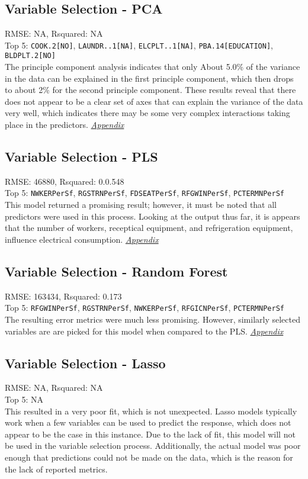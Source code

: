 \subsection{Variable Selection - PCA}
RMSE: NA, Rsquared: NA\\
Top 5: \lstinline{COOK.2[NO]}, \lstinline{LAUNDR..1[NA]}, \lstinline{ELCPLT..1[NA]}, \lstinline{PBA.14[EDUCATION]}, \lstinline{BLDPLT.2[NO]}
\\[0.1in]
\indent The principle component analysis indicates that only About 5.0\% of the variance in the data can be explained in the first principle component, which then drops to about 2\% for the second principle component.  These results reveal that there does not appear to be a clear set of axes that can explain the variance of the data very well, which indicates there may be some very complex interactions taking place in the predictors.  \textit{\hyperref[appendix:electricity:pca]{Appendix}}

\subsection{Variable Selection - PLS}
RMSE: 46880, Rsquared: 0.0.548\\
Top 5: \lstinline{NWKERPerSf}, \lstinline{RGSTRNPerSf}, \lstinline{FDSEATPerSf}, \lstinline{RFGWINPerSf}, \lstinline{PCTERMNPerSf}
\\[0.1in]
\indent This model returned a promising result; however, it must be noted that all predictors were used in this process.  Looking at the output thus far, it is appears that the number of workers, receptical equipment, and refrigeration equipment, influence electrical consumption.  \textit{\hyperref[appendix:electricity:pls]{Appendix}}

\subsection{Variable Selection - Random Forest}
RMSE: 163434, Rsquared: 0.173\\
Top 5: \lstinline{RFGWINPerSf}, \lstinline{RGSTRNPerSf}, \lstinline{NWKERPerSf}, \lstinline{RFGICNPerSf},  \lstinline{PCTERMNPerSf}
\\[0.1in]
\indent The resulting error metrics were much less promising.  However, similarly selected variables are are picked for this model when compared to the PLS.  \textit{\hyperref[appendix:electricity:rf]{Appendix}}

\subsection{Variable Selection - Lasso}
RMSE: NA, Rsquared: NA\\
 Top 5: NA
\\[0.1in]
\indent This resulted in a very poor fit, which is not unexpected.  Lasso models typically work when a few variables can be used to predict the response, which does not appear to be the case in this instance.  Due to the lack of fit, this model will not be used in the variable selection process.  Additionally, the actual model was poor enough that predictions could not be made on the data, which is the reason for the lack of reported metrics.

